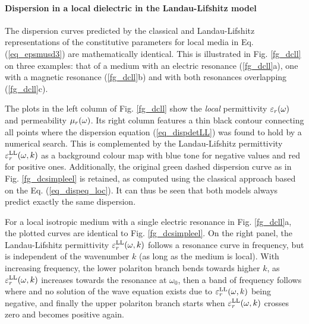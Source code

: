 \paragraph{Dispersion in a local dielectric in the Landau-Lifshitz model} %
The dispersion curves predicted by the classical and Landau-Lifshitz representations of the constitutive parameters for local media in Eq. (\ref{eq_epsmusd3}) are mathematically identical. This is illustrated in Fig. \ref{fg_dcll} on three examples: that of a medium with an electric resonance (\ref{fg_dcll}a), one with  a magnetic resonance (\ref{fg_dcll}b) and  with both resonances overlapping (\ref{fg_dcll}c). 

The plots in the left column of Fig. \ref{fg_dcll} show the \textit{local} permittivity $\varepsilon_r(\omega)$ and permeability $\mu_r(\omega)$.
Its right column features a thin black contour connecting all points where the dispersion equation (\ref{eq_dispdetLL}) was found to hold by a numerical search.
This is complemented by the Landau-Lifshitz permittivity $\varepsilon_r^\text{LL}(\omega, k)$ as a background colour map with blue tone for negative values and red for positive ones. 
Additionally, the original green dashed dispersion curve as in Fig. \ref{fg_dcsimpleel} is retained, as computed using the classical approach based on the Eq. (\ref{eq_dispeq_loc}). It can thus be seen that both models always predict exactly the same dispersion.

For a local isotropic medium with a single electric resonance in Fig. \ref{fg_dcll}a, the plotted curves are identical to Fig. \ref{fg_dcsimpleel}. On the right panel, the Landau-Lifshitz permittivity $\varepsilon_r^\text{LL}(\omega, k)$ follows a resonance curve in frequency, but is independent of the wavenumber $k$ (as long as the medium is local). With increasing frequency, the lower polariton branch bends towards higher $k$, as $\varepsilon_r^\text{LL}(\omega, k)$ increases towards the resonance at $\omega_0$, then a band of frequency follows where and no solution of the wave equation \cite{klingshirn2007semiconductor}
exists due to $\varepsilon_r^\text{LL}(\omega, k)$ being negative, and finally the upper polariton branch starts when $\varepsilon_r^\text{LL}(\omega, k)$ crosses zero and becomes positive again.

